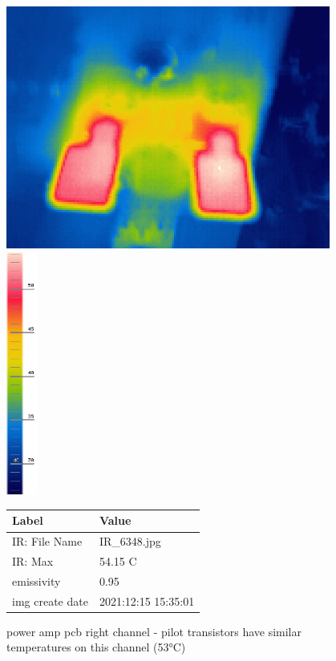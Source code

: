 \documentclass[a4paper,twoside]{report}
\begin{document}
\begin{figure}[hptb!]
 \centering
 \includegraphics[height=8cm, keepaspectratio=true]{img_report/IR_6348}
 \includegraphics[height=8cm, keepaspectratio=true]{img_report/IR_6348_scale}
 \label{fig:pwr-left-ch-ir}

 \vspace*{5mm}
 \begin{tabular}{ l | l }
  Label & Value \\ \hline
  IR: File Name & IR\_6348.jpg \\
  IR: Max & 54.15 C \\
  emissivity & 0.95 \\
  img create date & 2021:12:15 15:35:01 \\
 \end{tabular}
 \caption{power amp pcb right channel - pilot transistors have similar temperatures on this channel (53\si{\celsius})}
\end{figure}
\end{document}
